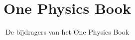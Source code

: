 \documentclass[11pt,a4paper,twoside,openany]{book}
\title{One Physics Book}
\author{De bijdragers van het One Physics Book}
\date{\bookdate}
\begin{document}
\frontmatter




\tableofcontents

\mainmatter



\appendix
\part{\omsolutionspart}


\backmatter
\printindex
\end{document}
